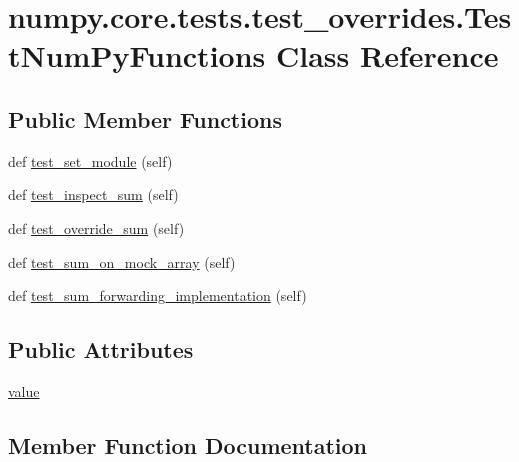 \hypertarget{classnumpy_1_1core_1_1tests_1_1test__overrides_1_1TestNumPyFunctions}{}\section{numpy.\+core.\+tests.\+test\+\_\+overrides.\+Test\+Num\+Py\+Functions Class Reference}
\label{classnumpy_1_1core_1_1tests_1_1test__overrides_1_1TestNumPyFunctions}
\subsection*{Public Member Functions}
\begin{DoxyCompactItemize}
\item 
def \hyperlink{classnumpy_1_1core_1_1tests_1_1test__overrides_1_1TestNumPyFunctions_a67006be35e62740a0326b8eb1bf19630}{test\+\_\+set\+\_\+module} (self)
\item 
def \hyperlink{classnumpy_1_1core_1_1tests_1_1test__overrides_1_1TestNumPyFunctions_a161508c09e3cc9f6148ff3df85f42c45}{test\+\_\+inspect\+\_\+sum} (self)
\item 
def \hyperlink{classnumpy_1_1core_1_1tests_1_1test__overrides_1_1TestNumPyFunctions_a6ec977316852a19ce111ed20326b820d}{test\+\_\+override\+\_\+sum} (self)
\item 
def \hyperlink{classnumpy_1_1core_1_1tests_1_1test__overrides_1_1TestNumPyFunctions_ac73427945116a4fce8b1ee8172e72904}{test\+\_\+sum\+\_\+on\+\_\+mock\+\_\+array} (self)
\item 
def \hyperlink{classnumpy_1_1core_1_1tests_1_1test__overrides_1_1TestNumPyFunctions_a2cce2199347af8639ecc9082823319c6}{test\+\_\+sum\+\_\+forwarding\+\_\+implementation} (self)
\end{DoxyCompactItemize}
\subsection*{Public Attributes}
\begin{DoxyCompactItemize}
\item 
\hyperlink{classnumpy_1_1core_1_1tests_1_1test__overrides_1_1TestNumPyFunctions_a285c8e7c1e7dfe8755514dff93def5d2}{value}
\end{DoxyCompactItemize}


\subsection{Member Function Documentation}
\mbox{\label{classnumpy_1_1core_1_1tests_1_1test__overrides_1_1TestNumPyFunctions_a161508c09e3cc9f6148ff3df85f42c45}} 
